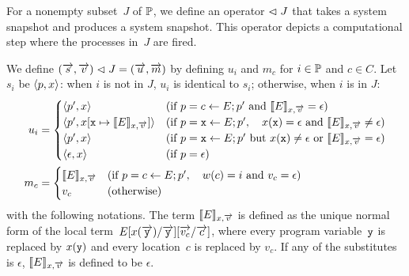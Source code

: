 For a nonempty subset~$J$ of $\mathbb{P}$, we define an operator $\vartriangleleft J$ that
takes a system snapshot and produces a system snapshot.
This operator depicts a computational step where the processes in~$J$
are fired.

We define $
(\overrightarrow s, \overrightarrow v) \vartriangleleft J = (\overrightarrow u, \overrightarrow m)$
by defining $u_i$ and $m_c$ for $i\in\mathbb{P}$ and $c \in C$.
Let $s_i$ be $\langle{p,x}\rangle$:
when $i$ is not in $J$, $u_i$ is identical to $s_i$; otherwise, when $i$
is in $J$:
\begin{align*}
 u_i & =
   \begin{cases}
    \langle{p',x}\rangle  & (\text{if } p = c
    \leftarrow E; p' \text{ and }\llbracket{E}\rrbracket_{x,\overrightarrow v} = \epsilon)
    \\
    \langle{p', x[\texttt{x} \mapsto \llbracket{E}\rrbracket_{x, \overrightarrow v}]}\rangle&
    (\text{if } p = \texttt{x} \leftarrow E; p', \quad
    x(\texttt{x}) = \epsilon  \text{ and } \llbracket{E}\rrbracket_{x, \overrightarrow v} \neq \epsilon)
    \\
    \langle{p', x}\rangle & (\text{if } p = \texttt{x} \leftarrow E; p' \text{
    but } x(\texttt{x})\neq \epsilon \text{ or }\llbracket{E}\rrbracket_{x,\overrightarrow v} = \epsilon
    ) \\
    \langle{\epsilon, x}\rangle & (\text{if } p = \epsilon)
   \end{cases}\\
 m_c & =
   \begin{cases}
   \llbracket{E}\rrbracket_{x, \overrightarrow v} & (\text{if } p = c \leftarrow E; p',\quad w(c)= i
    \text{
   and } v_c = \epsilon) \\
   v_c &(\text{otherwise})
   \end{cases}\\
\end{align*}
with the following notations.
The term
$\llbracket{E}\rrbracket_{x, \overrightarrow v}$ is defined as the unique normal form
of the local term~$E[x(\overrightarrow{\texttt{y}}) / \overrightarrow{\texttt{y}}][\overrightarrow{v_c}/\overrightarrow c]$, where
every program variable~$\texttt{y}$ is replaced by $x(\texttt{y})$
and every location~$c$ is replaced by $v_c$.
If any of the substitutes is $\epsilon$,
$\llbracket{E}\rrbracket_{x, \overrightarrow v}$ is defined to be $\epsilon$.

